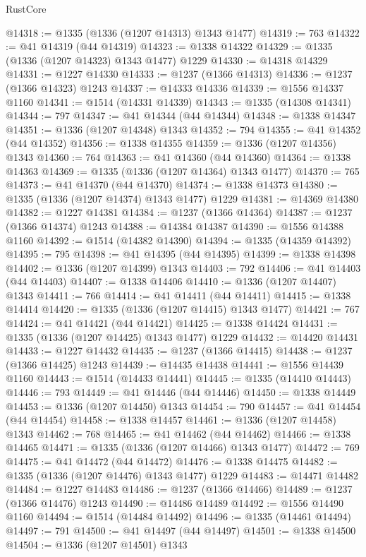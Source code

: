 \begin{lexlean}{RustCore}
\begin{coremodule}
@14318 := @1335 (@1336 (@1207 @14313) @1343 @1477)
@14319 := 763
@14322 := @41 @14319 (@44 @14319)
@14323 := @1338 @14322
@14329 := @1335 (@1336 (@1207 @14323) @1343 @1477) @1229
@14330 := @14318 @14329
@14331 := @1227 @14330
@14333 := @1237 (@1366 @14313)
@14336 := @1237 (@1366 @14323) @1243
@14337 := @14333 @14336
@14339 := @1556 @14337 @1160
@14341 := @1514 (@14331 @14339)
@14343 := @1335 (@14308 @14341)
@14344 := 797
@14347 := @41 @14344 (@44 @14344)
@14348 := @1338 @14347
@14351 := @1336 (@1207 @14348) @1343
@14352 := 794
@14355 := @41 @14352 (@44 @14352)
@14356 := @1338 @14355
@14359 := @1336 (@1207 @14356) @1343
@14360 := 764
@14363 := @41 @14360 (@44 @14360)
@14364 := @1338 @14363
@14369 := @1335 (@1336 (@1207 @14364) @1343 @1477)
@14370 := 765
@14373 := @41 @14370 (@44 @14370)
@14374 := @1338 @14373
@14380 := @1335 (@1336 (@1207 @14374) @1343 @1477) @1229
@14381 := @14369 @14380
@14382 := @1227 @14381
@14384 := @1237 (@1366 @14364)
@14387 := @1237 (@1366 @14374) @1243
@14388 := @14384 @14387
@14390 := @1556 @14388 @1160
@14392 := @1514 (@14382 @14390)
@14394 := @1335 (@14359 @14392)
@14395 := 795
@14398 := @41 @14395 (@44 @14395)
@14399 := @1338 @14398
@14402 := @1336 (@1207 @14399) @1343
@14403 := 792
@14406 := @41 @14403 (@44 @14403)
@14407 := @1338 @14406
@14410 := @1336 (@1207 @14407) @1343
@14411 := 766
@14414 := @41 @14411 (@44 @14411)
@14415 := @1338 @14414
@14420 := @1335 (@1336 (@1207 @14415) @1343 @1477)
@14421 := 767
@14424 := @41 @14421 (@44 @14421)
@14425 := @1338 @14424
@14431 := @1335 (@1336 (@1207 @14425) @1343 @1477) @1229
@14432 := @14420 @14431
@14433 := @1227 @14432
@14435 := @1237 (@1366 @14415)
@14438 := @1237 (@1366 @14425) @1243
@14439 := @14435 @14438
@14441 := @1556 @14439 @1160
@14443 := @1514 (@14433 @14441)
@14445 := @1335 (@14410 @14443)
@14446 := 793
@14449 := @41 @14446 (@44 @14446)
@14450 := @1338 @14449
@14453 := @1336 (@1207 @14450) @1343
@14454 := 790
@14457 := @41 @14454 (@44 @14454)
@14458 := @1338 @14457
@14461 := @1336 (@1207 @14458) @1343
@14462 := 768
@14465 := @41 @14462 (@44 @14462)
@14466 := @1338 @14465
@14471 := @1335 (@1336 (@1207 @14466) @1343 @1477)
@14472 := 769
@14475 := @41 @14472 (@44 @14472)
@14476 := @1338 @14475
@14482 := @1335 (@1336 (@1207 @14476) @1343 @1477) @1229
@14483 := @14471 @14482
@14484 := @1227 @14483
@14486 := @1237 (@1366 @14466)
@14489 := @1237 (@1366 @14476) @1243
@14490 := @14486 @14489
@14492 := @1556 @14490 @1160
@14494 := @1514 (@14484 @14492)
@14496 := @1335 (@14461 @14494)
@14497 := 791
@14500 := @41 @14497 (@44 @14497)
@14501 := @1338 @14500
@14504 := @1336 (@1207 @14501) @1343

\end{coremodule}
\end{lexlean}
